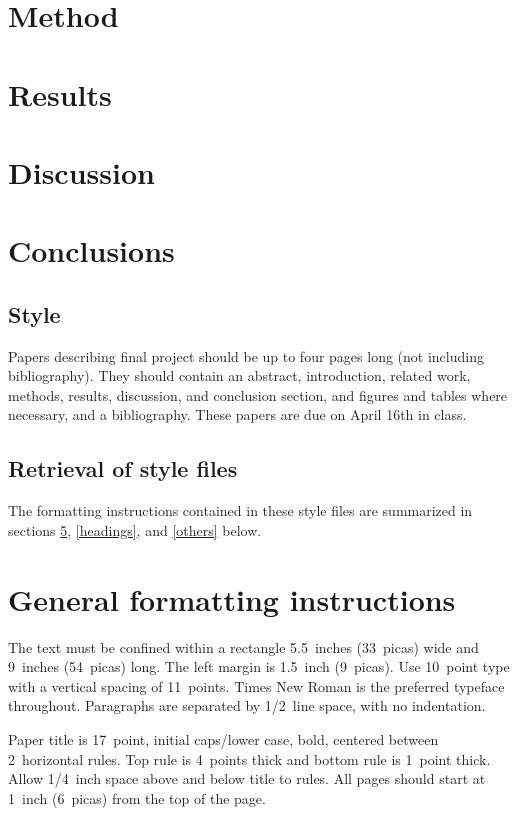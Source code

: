 \documentclass{article} %
\begin{document}
\section{Method}
\section{Results}
\section{Discussion}
\section{Conclusions}

\subsection{Style}

Papers describing final project should be up to four pages long (not including bibliography). They should contain an abstract, introduction, related work, methods, results, discussion, and conclusion section, and figures and tables where necessary, and a bibliography. These papers are due on April 16th in class.


\subsection{Retrieval of style files}

The formatting instructions contained in these style files are summarized in
sections \ref{gen_inst}, \ref{headings}, and \ref{others} below.

\section{General formatting instructions}
\label{gen_inst}

The text must be confined within a rectangle 5.5~inches (33~picas) wide and
9~inches (54~picas) long. The left margin is 1.5~inch (9~picas).
Use 10~point type with a vertical spacing of 11~points. Times New Roman is the
preferred typeface throughout. Paragraphs are separated by 1/2~line space,
with no indentation.

Paper title is 17~point, initial caps/lower case, bold, centered between
2~horizontal rules. Top rule is 4~points thick and bottom rule is 1~point
thick. Allow 1/4~inch space above and below title to rules. All pages should
start at 1~inch (6~picas) from the top of the page.
\end{document}
